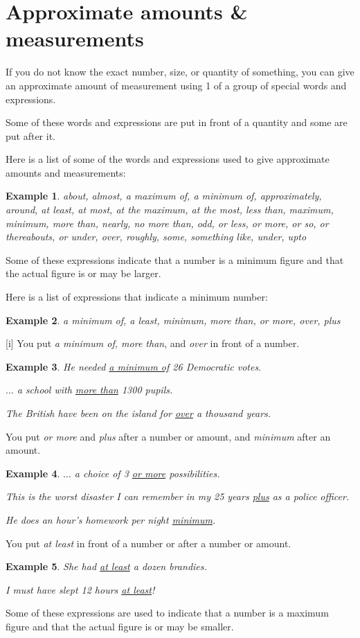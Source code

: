 \documentclass[oneside]{book}
\numberwithin{equation}{section}
\newtheorem{example}{Example}[section]
\begin{document}
\section{Approximate amounts \& measurements}
\noindent{} If you do not know the exact number, size, or quantity of something, you can give an approximate amount of measurement using 1 of a group of special words and expressions.

Some of these words and expressions are put in front of a quantity and some are put after it.

%
Here is a list of some of the words and expressions used to give approximate amounts and measurements:
\begin{example}
    about, almost, a maximum of, a minimum of, approximately, around, at least, at most, at the maximum, at the most, less than, maximum, minimum, more than, nearly, no more than, odd, or less, or more, or so, or thereabouts, or under, over, roughly, some, something like, under, upto
\end{example}
%
\noindent{} Some of these expressions indicate that a number is a minimum figure and that the actual figure is or may be larger.

%
Here is a list of expressions that indicate a minimum number:
\begin{example}
    a minimum of, a least, minimum, more than, or more, over, plus
\end{example}
%
\noindent{} [i] You put \textit{a minimum of, more than}, and \textit{over} in front of a number.
\begin{example}
    He needed \underline{a minimum of} 26 Democratic votes.
    
    $\ldots$ a school with \underline{more than} 1300 pupils.
    
    The British have been on the island for \underline{over} a thousand years.
\end{example}
You put \textit{or more} and \textit{plus} after a number or amount, and \textit{minimum} after an amount.
\begin{example}
    $\ldots$ a choice of 3 \underline{or more} possibilities.
    
    This is the worst disaster I can remember in my 25 years \underline{plus} as a police officer.
    
    He does an hour's homework per night \underline{minimum}.
\end{example}
You put \textit{at least} in front of a number or after a number or amount.
\begin{example}
    She had \underline{at least} a dozen brandies.
    
    I must have slept 12 hours \underline{at least}!
\end{example}
%
\noindent{} Some of these expressions are used to indicate that a number is a maximum figure and that the actual figure is or may be smaller.
\end{document}
